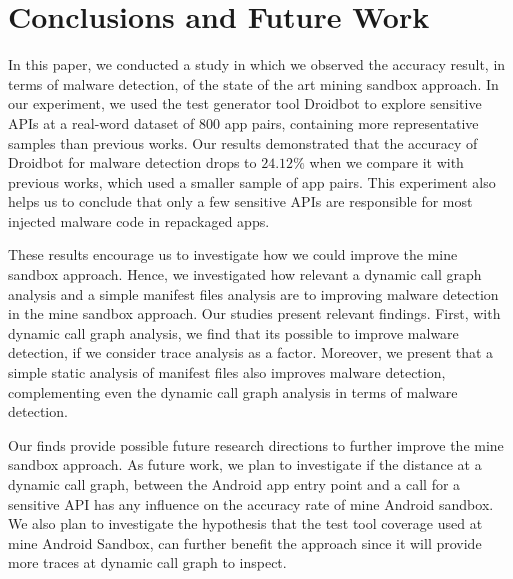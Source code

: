\section{Conclusions and Future Work}\label{sec:conclusions}

In this paper, we conducted a study in which we observed the accuracy result, in terms of malware detection, of the state of the art mining sandbox approach. In our experiment, we used the test generator tool Droidbot to explore sensitive APIs at a real-word dataset of $800$ app pairs, containing more representative samples than previous works. Our results demonstrated that the accuracy of Droidbot for malware detection drops to $24.12\%$ when we compare it with previous works, which used a smaller sample of app pairs. This experiment also helps us to conclude that only a few sensitive APIs are responsible for most injected malware code in repackaged apps.

These results encourage us to investigate how we could improve the mine sandbox approach. Hence, we investigated how relevant a dynamic call graph analysis and a simple manifest files analysis are to improving malware detection in the mine sandbox approach. Our studies present relevant findings. First, with dynamic call graph analysis, we find that its possible to improve malware detection, if we consider trace analysis as a factor. Moreover, we present that a simple static analysis of manifest files also improves malware detection, complementing even the dynamic call graph analysis in terms of malware detection.

Our finds provide possible future research directions to further improve the mine sandbox approach. As future work, we plan to investigate if the distance at a dynamic call graph, between the Android app entry point and a call for a sensitive API has any influence on the accuracy rate of mine Android sandbox. We also plan to investigate the hypothesis that the test tool coverage used at mine Android Sandbox, can further benefit the approach since it will provide more traces at dynamic call graph to inspect.

